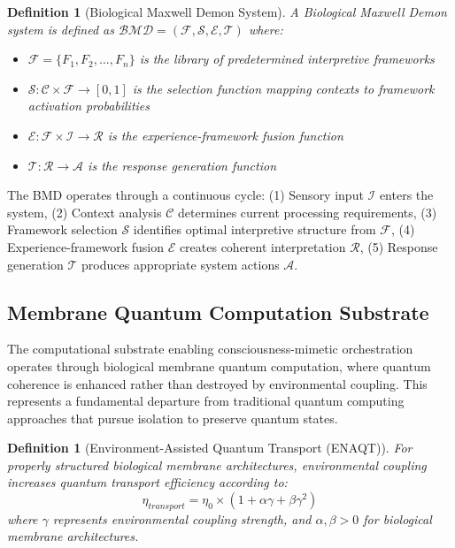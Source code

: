 \documentclass[12pt,a4paper]{article}
\newtheorem{definition}[theorem]{Definition}
\begin{document}
\begin{definition}[Biological Maxwell Demon System]
A Biological Maxwell Demon system is defined as $\mathcal{BMD} = (\mathcal{F}, \mathcal{S}, \mathcal{E}, \mathcal{T})$ where:
\begin{itemize}
\item $\mathcal{F} = \{F_1, F_2, \ldots, F_n\}$ is the library of predetermined interpretive frameworks
\item $\mathcal{S}: \mathcal{C} \times \mathcal{F} \rightarrow [0,1]$ is the selection function mapping contexts to framework activation probabilities
\item $\mathcal{E}: \mathcal{F} \times \mathcal{I} \rightarrow \mathcal{R}$ is the experience-framework fusion function
\item $\mathcal{T}: \mathcal{R} \rightarrow \mathcal{A}$ is the response generation function
\end{itemize}
\end{definition}

The BMD operates through a continuous cycle: (1) Sensory input $\mathcal{I}$ enters the system, (2) Context analysis $\mathcal{C}$ determines current processing requirements, (3) Framework selection $\mathcal{S}$ identifies optimal interpretive structure from $\mathcal{F}$, (4) Experience-framework fusion $\mathcal{E}$ creates coherent interpretation $\mathcal{R}$, (5) Response generation $\mathcal{T}$ produces appropriate system actions $\mathcal{A}$.

\subsection{Membrane Quantum Computation Substrate}

The computational substrate enabling consciousness-mimetic orchestration operates through biological membrane quantum computation, where quantum coherence is enhanced rather than destroyed by environmental coupling. This represents a fundamental departure from traditional quantum computing approaches that pursue isolation to preserve quantum states.

\begin{definition}[Environment-Assisted Quantum Transport (ENAQT)]
For properly structured biological membrane architectures, environmental coupling increases quantum transport efficiency according to:
$$\eta_{transport} = \eta_0 \times (1 + \alpha \gamma + \beta \gamma^2)$$
where $\gamma$ represents environmental coupling strength, and $\alpha, \beta > 0$ for biological membrane architectures.
\end{definition}
\end{document}

